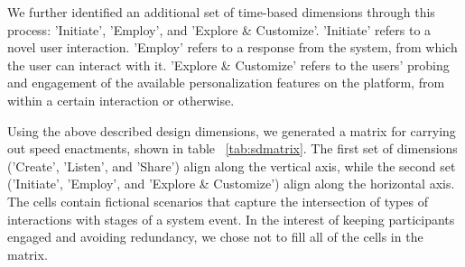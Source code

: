 {We further identified an additional set of time-based dimensions through this process: 'Initiate', 'Employ', and 'Explore \& Customize'. 'Initiate' refers to a novel user interaction. 'Employ' refers to a response from the system, from which the user can interact with it. 'Explore \& Customize' refers to the users' probing and engagement of the available personalization features on the platform, from within a certain interaction or otherwise.

Using the above described design dimensions, we generated a matrix for carrying out speed enactments, shown in table ~\ref{tab:sdmatrix}. The first set of dimensions ('Create', 'Listen', and 'Share') align along the vertical axis, while the second set ('Initiate', 'Employ', and 'Explore \& Customize') align along the horizontal axis. The cells contain fictional scenarios that capture the intersection of types of interactions with stages of a system event. In the interest of keeping participants engaged and avoiding redundancy, we chose not to fill all of the cells in the matrix. 

}
